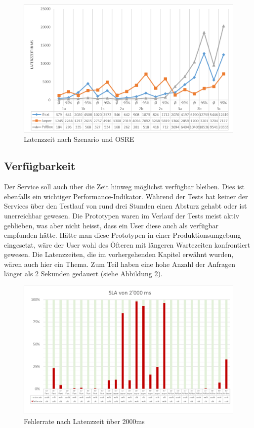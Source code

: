 \documentclass[main.tex]{subfiles}
\begin{document}
\begin{figure}[!h]
\includegraphics[width=\textwidth]{mainpart/4_analyse_img/LatenzzeitSzen.png}
 \caption{Latenzzeit nach Szenario und OSRE}
 \label{figure:latencySzenario}
\end{figure}

\subsection{Verfügbarkeit}

Der Service soll auch über die Zeit hinweg möglichst verfügbar bleiben. Dies ist ebenfalls ein wichtiger Performance-Indikator. Während der Tests hat keiner der Services über den Testlauf von rund drei Stunden einen Absturz gehabt oder ist unerreichbar gewesen. Die Prototypen waren im Verlauf der Tests meist aktiv geblieben, was aber nicht heisst, dass ein User diese auch als verfügbar empfunden hätte. Hätte man diese Prototypen in einer Produktionsumgebung eingesetzt, wäre der User wohl des Öfteren mit längeren Wartezeiten konfrontiert gewesen. 
Die Latenzzeiten, die im vorhergehenden Kapitel erwähnt wurden, wären auch hier ein Thema. Zum Teil haben eine hohe Anzahl der Anfragen länger als 2 Sekunden gedauert (siehe Abbildung \ref{figure:latencySLA2000}).

\begin{figure}[!h]
\includegraphics[width=\textwidth]{mainpart/4_analyse_img/latencySLA2000.png}
 \caption{Fehlerrate nach Latenzzeit über 2000ms}
 \label{figure:latencySLA2000}
\end{figure}
\end{document}

